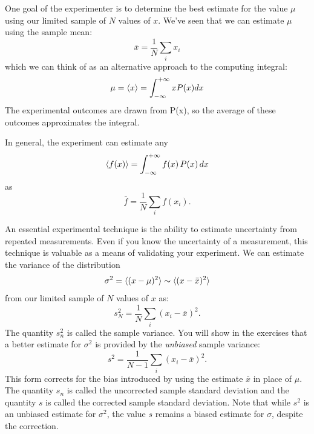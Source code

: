 \documentclass[12pt,oneside]{book}
\begin{document}
One goal of the experimenter is to determine the best estimate for the
value $\mu$ using our limited sample of $N$ values of $x$.  We've seen that we can estimate $\mu$ using the sample mean:
\begin{displaymath}
\bar{x} = \frac{1}{N} \sum_i x_i
\end{displaymath}
which we can think of as an alternative approach to the computing integral:
\begin{displaymath}
\mu = \braket{x} = \int_{-\infty}^{+\infty} x P(x) dx
\end{displaymath}
The experimental outcomes are drawn from P(x), so the average of these outcomes approximates the integral.

In general, the experiment can estimate any
\begin{displaymath}
\braket{f(x)} = \int_{-\infty}^{+\infty} f(x) \, P(x) \, dx
\end{displaymath}
as
\begin{displaymath}
\bar{f} = \frac{1}{N} \sum_i f(x_i). 
\end{displaymath}

An essential experimental technique is the ability to estimate
uncertainty from repeated measurements.  Even if you know the
uncertainty of a measurement, this technique is valuable as a means of
validating your experiment.  We can estimate the variance of the distribution
\begin{displaymath}
 \sigma^2 = \braket{(x-\mu)^2} \sim \braket{(x - \bar{x})^2}
\end{displaymath}
from our limited sample of $N$ values of $x$ as:
\begin{displaymath}
s_N^2  = \frac{1}{N} \sum_i (x_i-\bar{x})^2.
\end{displaymath}
The quantity $s_n^2$ is called the sample variance.  You will show in
the exercises that a better estimate for $\sigma^2$ is provided by the {\em unbiased}
sample variance:
\begin{displaymath}
\label{eqn:sampvar}
s^2  = \frac{1}{N-1} \sum_i (x_i-\bar{x})^2.
\end{displaymath}
This form corrects for the bias introduced by using the estimate
$\bar{x}$ in place of $\mu$.  The quantity $s_n$ is called the
uncorrected sample standard deviation and the quantity $s$ is called
the corrected sample standard deviation.  Note that while $s^2$ is an
unbiased estimate for $\sigma^2$, the value $s$ remains a biased
estimate for $\sigma$, despite the correction.
\end{document}
